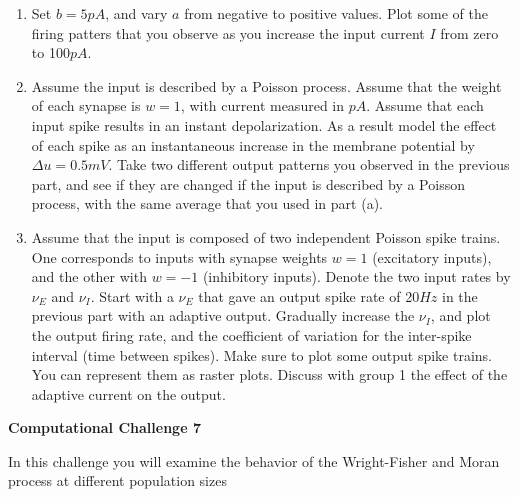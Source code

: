 \documentclass[12pt]{article}
\begin{document}
\begin{enumerate}
\begin{enumerate}
\item Set $ b = 5 pA$, and vary $a$ from negative to positive values. Plot some of the firing patters that you observe as you increase the input current $I$ 
from zero to 100$pA$. 
\item Assume the input is described by a Poisson process. Assume that the weight of each synapse is $w = 1$,
with current measured in $pA$.  Assume that each input spike results in an instant depolarization.  As a result model the effect of each spike as  an instantaneous increase in the membrane potential
by $\Delta u = 0.5mV$.  Take two different output patterns you observed in the previous part, and see if they are changed if the input is described by a Poisson process, with the same average that you used in part (a).
\item Assume that the input is composed of two independent Poisson spike trains.  One corresponds to inputs with synapse weights $w = 1$ (excitatory inputs), and the other with $w = -1$ (inhibitory inputs).  Denote the two input rates by $\nu_E$ and $\nu_I$. Start with a $\nu_E$ that gave an output spike rate of 20$Hz$ in the previous part with an adaptive output. Gradually increase the $\nu_I$, and plot the output firing rate, and the coefficient of variation for the inter-spike interval (time between spikes).  Make sure to plot some output spike trains. You can represent them as raster plots.  Discuss with group 1 the effect of the adaptive current on the output.
\end{enumerate}

\end{enumerate}


\begin{center}
{\Large \bf Computational Challenge 7
\\ \vskip5mm }
\end{center}

In this challenge you will examine the behavior of the Wright-Fisher and Moran process at different population sizes   
\end{document}
